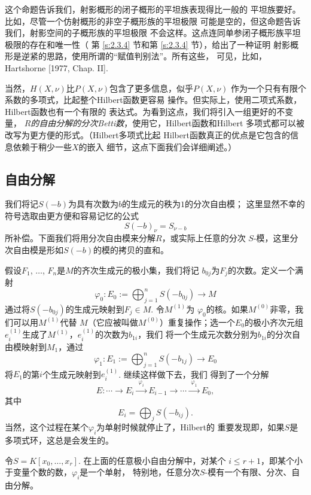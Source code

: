 这个命题告诉我们，射影概形的闭子概形的平坦族表现得比一般的
平坦族要好。比如，尽管一个仿射概形的非空子概形族的平坦极限
可能是空的，但这命题告诉我们，射影空间的子概形族的平坦极限
不会这样。这点连同单参闭子概形族平坦极限的存在和唯一性（
第 \ref{s:2.3.4} 节和第 \ref{s:2.3.4} 节），给出了一种证明
射影概形是逆紧的思路，使用所谓的“赋值判别法”。所有这些，
可见，比如，Hartshorne [1977, Chap. II].

当然，$H(X,\nu)$比$P(X,\nu)$包含了更多信息，似乎$P(X,\nu)$
作为一个只有有限个系数的多项式，比起整个Hilbert函数更容易%
操作。但实际上，使用二项式系数，Hilbert函数也有一个有限的
表达式。为看到这点，我们将引入一组更好的不变量，\textit{
$R$的自由分解的分次Betti数}，使用它，Hilbert函数和Hilbert
多项式都可以被改写为更方便的形式。（Hilbert多项式比起
Hilbert函数真正的优点是它包含的信息依赖于稍少一些$X$的嵌入
细节，这点下面我们会详细阐述。）

\subsection{自由分解}\label{s:3.3.3}

我们将记$S(-b)$为具有次数为$b$的生成元的秩为$1$的分次自由模；
这里显然不幸的符号选取由更方便和容易记忆的公式
\[
	S(-b)_\nu =S_{\nu-b}
\]
所补偿。下面我们将用分次自由模来分解$R$，或实际上任意的分次
$S$-模，这里分次自由模是形如$S(-b)$的模的拷贝的直和。

假设$F_1$, $\dots$, $F_n$是$M$的齐次生成元的极小集，我们将记
$b_{0j}$为$F_j$的次数。定义一个满射
\[
	\varphi_0:E_0:=\bigoplus_{j=1}^n S(-b_{0j})\to M
\]
通过将$S(-b_{0j})$的生成元映射到$F_j\in M$. 令$M^{(1)}$为
$\varphi_0$的核。如果$M^{(0)}$非零，我们可以用$M^{(1)}$代替
$M$（它应被叫做$M^{(0)}$）重复操作；选一个$E_0$的极小齐次元组
$e^{(1)}_i$生成了$M^{(1)}$，$e^{(1)}_i$的次数为$b_{1i}$，我们
将一个生成元次数分别为$b_{1i}$的分次自由模映射到$M_1$，通过
\[
	\varphi_1:E_1:=\bigoplus_{j=1}^n S(-b_{1j})\to E_0
\]
将$E_1$的第$i$个生成元映射到$e_i^{(1)}$. 继续这样做下去，我们
得到了一个分解
\[
	E:\cdots \longrightarrow E_i 
	\xrightarrow{\,\,\varphi_i\,\,} E_{i-1}
	\longrightarrow \cdots  \xrightarrow{\,\,\varphi_1\,\,}
	E_0,
\]
其中
\[
	E_{i}=\bigoplus_j S(-b_{ij}).
\]
当然，这个过程在某个$\varphi_i$为单射时候就停止了，Hilbert的
重要发现即，如果$S$是多项式环，这总是会发生的。


\begin{thm}[Hilbert合冲定理]
令$S=K[x_0,\dots,x_r]$. 在上面的任意极小自由分解中，对某个
$i\leq r+1$，即某个小于变量个数的数，$\varphi_i$是一个单射，
特别地，任意分次$S$-模有一个有限、分次、自由分解。
\end{thm}

